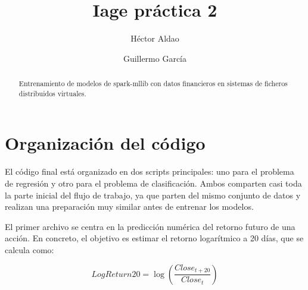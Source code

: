 \documentclass[runningheads]{llncs}
\begin{document}
\title{Iage práctica 2}

\author{Héctor Aldao \and Guillermo García}


%
\maketitle              %
%
\begin{abstract}

Entrenamiento de modelos de spark-mllib con datos financieros en sistemas de ficheros distribuidos virtuales.

\end{abstract}

%


\section{Organización del código}

El código final está organizado en dos scripts principales: uno para el problema de regresión y otro para el problema de clasificación. Ambos comparten casi toda la parte inicial del flujo de trabajo, ya que parten del mismo conjunto de datos y realizan una preparación muy similar antes de entrenar los modelos.

El primer archivo se centra en la predicción numérica del retorno futuro de una acción. En concreto, el objetivo es estimar el retorno logarítmico a 20 días, que se calcula como:

$$
\textit{LogReturn20} = \log\left(\frac{\textit{Close}_{t+20}}{\textit{Close}_{t}}\right)
$$
\end{document}

